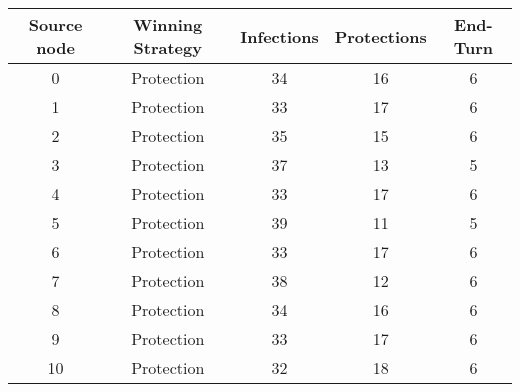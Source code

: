 \documentclass[results.tex]{subfiles}
\begin{document}
    \begin{center}
        \begin{tabular}{| c || c | c | c | c |}
            \hline
            {\bfseries Source node} & {\bfseries Winning Strategy} & {\bfseries Infections} & {\bfseries Protections}
            & {\bfseries End-Turn}
            \\  %
            \hline\hline
            0                       & Protection                   & 34                     & 16                      & 6                    \\
            \hline
            1                       & Protection                   & 33                     & 17                      & 6                    \\
            \hline
            2                       & Protection                   & 35                     & 15                      & 6                    \\
            \hline
            3                       & Protection                   & 37                     & 13                      & 5                    \\
            \hline
            4                       & Protection                   & 33                     & 17                      & 6                    \\
            \hline
            5                       & Protection                   & 39                     & 11                      & 5                    \\
            \hline
            6                       & Protection                   & 33                     & 17                      & 6                    \\
            \hline
            7                       & Protection                   & 38                     & 12                      & 6                    \\
            \hline
            8                       & Protection                   & 34                     & 16                      & 6                    \\
            \hline
            9                       & Protection                   & 33                     & 17                      & 6                    \\
            \hline
            10                      & Protection                   & 32                     & 18                      & 6                    \\

\end{tabular}
\end{center}
\end{document}
